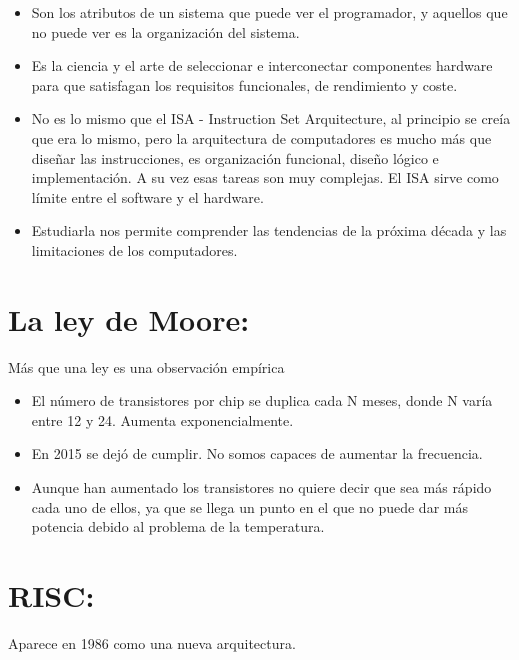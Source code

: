 \documentclass[12pt, twoside, openright]{report} %
\begin{document}
\begin{itemize}
  
  \item
    Son los atributos de un sistema que puede ver el programador, y
    aquellos que no puede ver es la organización del sistema.
  \item
    Es la ciencia y el arte de seleccionar e interconectar componentes
    hardware para que satisfagan los requisitos funcionales, de
    rendimiento y coste.
  \item
    No es lo mismo que el ISA - Instruction Set Arquitecture, al
    principio se creía que era lo mismo, pero la arquitectura de
    computadores es mucho más que diseñar las instrucciones, es
    organización funcional, diseño lógico e implementación. A su vez
    esas tareas son muy complejas. El ISA sirve como límite entre el
    software y el hardware.
  \item
    Estudiarla nos permite comprender las tendencias de la próxima
    década y las limitaciones de los computadores.
  \end{itemize}

  \section{La ley de Moore:}

  Más que una ley es una observación empírica
  
  \begin{itemize}
  \item
    El número de transistores por chip se duplica cada N meses, donde N
    varía entre 12 y 24. Aumenta exponencialmente.
  \item
    En 2015 se dejó de cumplir. No somos capaces de aumentar la
    frecuencia.
  \item
    Aunque han aumentado los transistores no quiere decir que sea más
    rápido cada uno de ellos, ya que se llega un punto en el que no
    puede dar más potencia debido al problema de la temperatura.
  \end{itemize}

  \section{RISC:}

  Aparece en 1986 como una nueva arquitectura.
\end{document}
